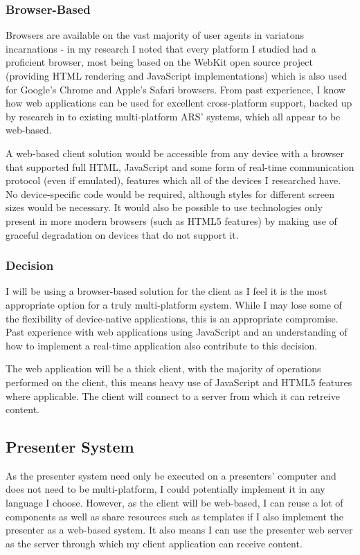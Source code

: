 \documentclass[a4papert,11pt,notitlepage]{ltxdoc}
\begin{document}
\subsubsection{Browser-Based}
Browsers are available on the vast majority of user agents in variatons incarnations - in my research I noted that every platform I studied had a proficient browser, most being based on the WebKit open source project (providing HTML rendering and JavaScript implementations) which is also used for Google's Chrome and Apple's Safari browsers. From past experience, I know how web applications can be used for excellent cross-platform support, backed up by research in to existing multi-platform ARS' systems, which all appear to be web-based.

A web-based client solution would be accessible from any device with a browser that supported full HTML, JavaScript and some form of real-time communication protocol (even if emulated), features which all of the devices I researched have. No device-specific code would be required, although styles for different screen sizes would be necessary. It would also be possible to use technologies only present in more modern browsers (such as HTML5 features) by making use of graceful degradation on devices that do not support it.

\subsubsection{Decision}
I will be using a browser-based solution for the client as I feel it is the most appropriate option for a truly multi-platform system. While I may lose some of the flexibility of device-native applications, this is an appropriate compromise. Past experience with web applications using JavaScript and an understanding of how to implement a real-time application also contribute to this decision.

The web application will be a thick client, with the majority of operations performed on the client, this means heavy use of JavaScript and HTML5 features where applicable. The client will connect to a server from which it can retreive content.

\subsection{Presenter System}
As the presenter system need only be executed on a presenters' computer and does not need to be multi-platform, I could potentially implement it in any language I choose. However, as the client will be web-based, I can reuse a lot of components as well as share resources such as templates if I also implement the presenter as a web-based system. It also means I can use the presenter web server as the server through which my client application can receive content.
\end{document}
